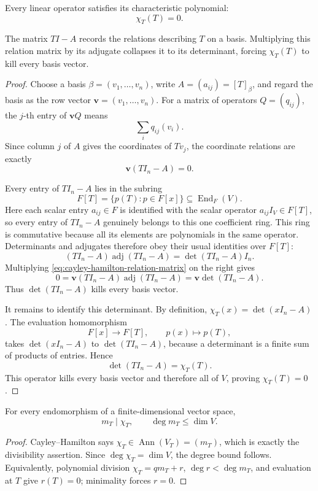 \begin{theorem}\label{thm:cayley-hamilton}
Every linear operator satisfies its characteristic polynomial:
\[\chi_T(T)=0.\]
\end{theorem}
\begin{proofidea}
The matrix \(TI-A\) records the relations describing \(T\) on a basis.
Multiplying this relation matrix by its adjugate collapses it to its
determinant, forcing \(\chi_T(T)\) to kill every basis vector.
\end{proofidea}
\begin{proof}
Choose a basis \(\beta=(v_1,\ldots,v_n)\), write
\(A=(a_{ij})=[T]_\beta\), and regard the basis as the row vector
\(\mathbf v=(v_1,\ldots,v_n)\). For a matrix of operators \(Q=(q_{ij})\),
the \(j\)-th entry of \(\mathbf vQ\) means
\[
\sum_i q_{ij}(v_i).
\]
Since column \(j\) of \(A\) gives the coordinates of
\(Tv_j\), the coordinate relations are exactly
\begin{equation}\label{eq:cayley-hamilton-relation-matrix}
\mathbf v(TI_n-A)=0.
\end{equation}

Every entry of \(TI_n-A\) lies in the subring
\[
F[T]=\{p(T):p\in F[x]\}\subseteq\operatorname{End}_F(V).
\]
Here each scalar entry \(a_{ij}\in F\) is identified with the scalar operator
\(a_{ij}I_V\in F[T]\), so every entry of \(TI_n-A\) genuinely belongs to
this one coefficient ring.
This ring is commutative because all its elements are polynomials in the same
operator. Determinants and adjugates therefore obey their usual identities
over \(F[T]\):
\[
(TI_n-A)\operatorname{adj}(TI_n-A)
=\det(TI_n-A)I_n.
\]
Multiplying \eqref{eq:cayley-hamilton-relation-matrix} on the right gives
\[
0=\mathbf v(TI_n-A)\operatorname{adj}(TI_n-A)
=\mathbf v\det(TI_n-A).
\]
Thus \(\det(TI_n-A)\) kills every basis vector.

It remains to identify this determinant. By definition,
\(\chi_T(x)=\det(xI_n-A)\). The evaluation homomorphism
\[
F[x]\longrightarrow F[T],\qquad p(x)\longmapsto p(T),
\]
takes \(\det(xI_n-A)\) to \(\det(TI_n-A)\), because a determinant is a
finite sum of products of entries. Hence
\[
\det(TI_n-A)=\chi_T(T).
\]
This operator kills every basis vector and therefore all of \(V\), proving
\(\chi_T(T)=0\).
\end{proof}

\begin{corollary}
\label{cor:minimal-divides-characteristic}
For every endomorphism of a finite-dimensional vector space,
\[
m_T\mid\chi_T,
\qquad \deg m_T\leq\dim V.
\]
\end{corollary}
\begin{proof}
Cayley--Hamilton says \(\chi_T\in\operatorname{Ann}(V_T)=(m_T)\), which is
exactly the divisibility assertion. Since \(\deg\chi_T=\dim V\), the degree
bound follows. Equivalently, polynomial division
\(\chi_T=qm_T+r\), \(\deg r<\deg m_T\), and evaluation at \(T\) give
\(r(T)=0\); minimality forces \(r=0\).
\end{proof}

